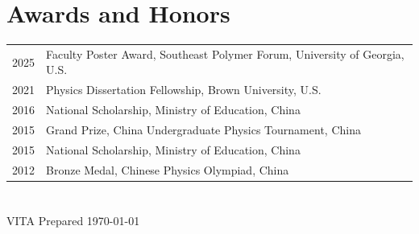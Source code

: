\documentclass[11pt,letterpaper]{article}
\begin{document}
\section*{Awards and Honors}
\vspace*{-0.15in}
\begin{longtable}{l p{\linewidth}}
    2025 & Faculty Poster Award, Southeast Polymer Forum, University of Georgia, U.S. \\
    2021 & Physics Dissertation Fellowship, Brown University, U.S.    \\
    2016 & National Scholarship, Ministry of Education, China         \\
    2015 & Grand Prize, China Undergraduate Physics Tournament, China \\
    2015 & National Scholarship, Ministry of Education, China         \\
    2012 & Bronze Medal, Chinese Physics Olympiad, China              \\
\end{longtable}

\section*{}
VITA Prepared \today
\end{document}
